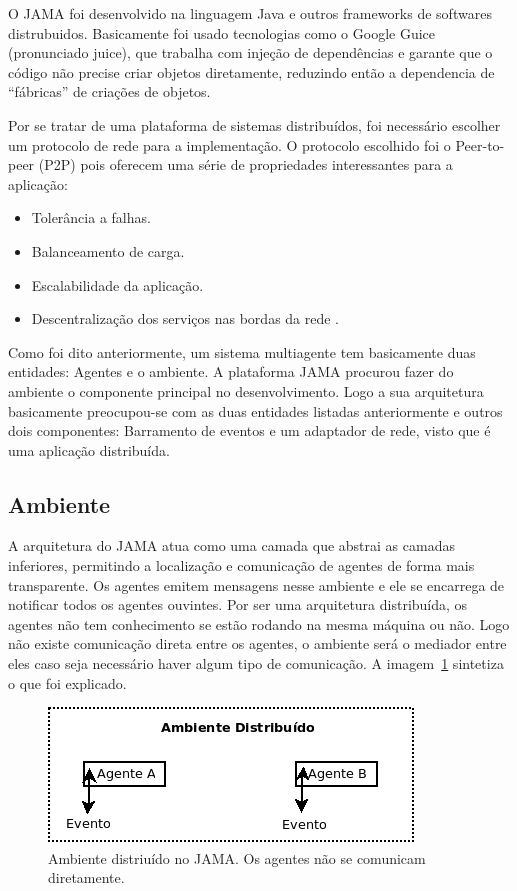 O JAMA foi desenvolvido na linguagem Java e outros frameworks de softwares distrubuidos. Basicamente foi usado tecnologias como o Google Guice (pronunciado juice), que trabalha com injeção de dependências e garante que o código não precise criar objetos diretamente, reduzindo então a dependencia de ``fábricas'' de criações de objetos.

Por se tratar de uma plataforma de sistemas distribuídos, foi necessário escolher um protocolo de rede para a implementação. O protocolo escolhido foi o Peer-to-peer (P2P) pois oferecem uma série de propriedades interessantes para a aplicação:
\begin{itemize}
	\item Tolerância a falhas.
	\item Balanceamento de carga.
	\item Escalabilidade da aplicação.
	\item Descentralização dos serviços nas bordas da rede	.
\end{itemize}

Como foi dito anteriormente, um sistema multiagente tem basicamente duas entidades: Agentes e o ambiente. A plataforma JAMA procurou fazer do ambiente o componente principal no desenvolvimento. Logo a sua arquitetura basicamente preocupou-se com as duas entidades listadas anteriormente e outros dois componentes: Barramento de eventos e um adaptador de rede, visto que é uma aplicação distribuída.

\subsection{Ambiente}

A arquitetura do JAMA atua como uma camada que abstrai as camadas inferiores, permitindo a localização e comunicação de agentes de forma mais transparente. Os agentes emitem mensagens nesse ambiente e ele se encarrega de notificar todos os agentes ouvintes. Por ser uma arquitetura distribuída, os agentes não tem conhecimento se estão rodando na mesma máquina ou não. Logo não existe comunicação direta entre os agentes, o ambiente será o mediador entre eles caso seja necessário haver algum tipo de comunicação. A imagem~\ref{fig:ambiente} sintetiza o que foi explicado.

\begin{figure}
	\centering
	\includegraphics[scale=0.75]{images/ambiente.png}
	\caption{Ambiente distriuído no JAMA. Os agentes não se comunicam diretamente.}
	\label{fig:ambiente}
\end{figure}

